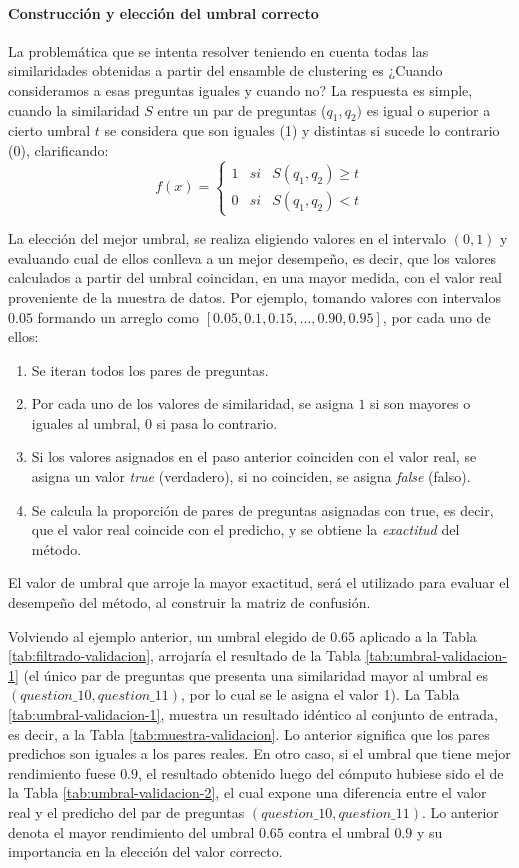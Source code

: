 \paragraph{Construcción y elección del umbral correcto}
La problemática que se intenta resolver teniendo en cuenta todas las similaridades obtenidas a partir del ensamble de clustering es ¿Cuando consideramos a esas preguntas iguales y cuando no? La respuesta es simple, cuando la similaridad \(S\) entre un par de preguntas (\(q_1,q_2)\) es igual o superior a cierto umbral \(t\) se considera que son iguales (1) y distintas si sucede lo contrario (0), clarificando:
\[f(x) = \left\{ \begin{array}{lcc} 1 & si & S(q_1, q_2)\geq t
	\\ 0 & si & S(q_1, q_2) < t
\end{array} \right.\]

La elección del mejor umbral, se realiza eligiendo valores en el intervalo \((0,1)\) y evaluando cual de ellos conlleva a un mejor desempeño, es decir, que los valores calculados a partir del umbral coincidan, en una mayor medida, con el valor real proveniente de la muestra de datos. Por ejemplo, tomando valores con intervalos \(0.05\) formando un arreglo como \([0.05, 0.1, 0.15, ..., 0.90, 0.95]\), por cada uno de ellos:
\begin{enumerate}
	\item Se iteran todos los pares de preguntas.
	\item Por cada uno de los valores de similaridad, se asigna \(1\) si son mayores o iguales al umbral, \(0\) si pasa lo contrario.
	\item Si los valores asignados en el paso anterior coinciden con el valor real, se asigna un valor \textit{true} (verdadero), si no coinciden, se asigna \textit{false} (falso).
	\item Se calcula la proporción de pares de preguntas asignadas con true, es decir, que el valor real coincide con el predicho, y se obtiene la \textit{exactitud} del método.
\end{enumerate}
El valor de umbral que arroje la mayor exactitud, será el utilizado para evaluar el desempeño del método, al construir la matriz de confusión.

\bigskip Volviendo al ejemplo anterior, un umbral elegido de \(0.65\) aplicado a la Tabla \ref{tab:filtrado-validacion}, arrojaría el resultado de la Tabla \ref{tab:umbral-validacion-1} (el único par de preguntas que presenta una similaridad mayor al umbral es \((question\_10, question\_11)\), por lo cual se le asigna el valor 1). La Tabla \ref{tab:umbral-validacion-1}, muestra un resultado idéntico al conjunto de entrada, es decir, a la Tabla \ref{tab:muestra-validacion}. Lo anterior significa que los pares predichos son iguales a los pares reales. En otro caso, si el umbral que tiene mejor rendimiento fuese \(0.9\), el resultado obtenido luego del cómputo hubiese sido el de la Tabla \ref{tab:umbral-validacion-2}, el cual expone una diferencia entre el valor real y el predicho del par de preguntas \((question\_10, question\_11)\). Lo anterior denota el mayor rendimiento del umbral \(0.65\) contra el umbral \(0.9\) y su importancia en la elección del valor correcto.

